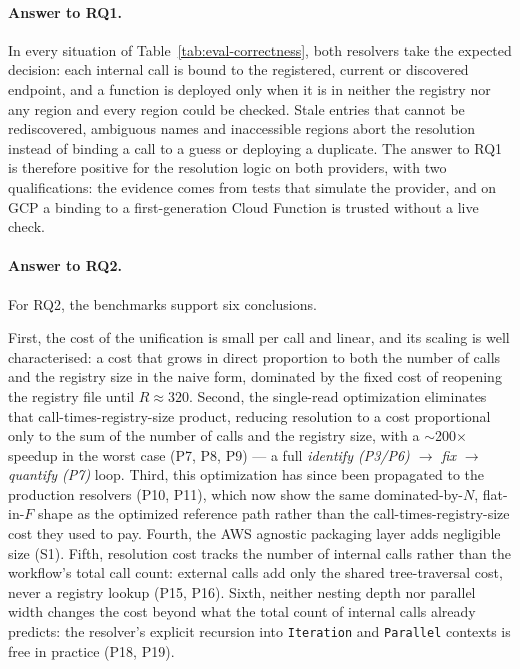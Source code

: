 \paragraph{Answer to RQ1.}
In every situation of Table~\ref{tab:eval-correctness}, both resolvers take the expected decision:
each internal call is bound to the registered, current or discovered endpoint, and a function is
deployed only when it is in neither the registry nor any region and every region could be checked.
Stale entries that cannot be rediscovered, ambiguous names and inaccessible regions abort the
resolution instead of binding a call to a guess or deploying a duplicate. The answer to RQ1 is
therefore positive for the resolution logic on both providers, with two qualifications: the
evidence comes from tests that simulate the provider, and on GCP a binding to a first-generation
Cloud Function is trusted without a live check.

\paragraph{Answer to RQ2.}
For RQ2, the benchmarks support six conclusions.

First, the cost of the unification is small per call and linear, and its scaling is well
characterised: a cost that grows in direct proportion to both the number of calls and the
registry size in the naive form, dominated by the fixed cost of reopening the
registry file until $R \approx 320$. Second, the single-read optimization eliminates that
call-times-registry-size product, reducing resolution to a cost proportional only to the sum of
the number of calls and the registry size, with a $\sim$200$\times$ speedup in the worst case
(P7, P8, P9) --- a full \emph{identify (P3/P6) $\rightarrow$ fix $\rightarrow$ quantify (P7)} loop.
Third, this optimization has since been propagated to the production resolvers (P10, P11), which
now show the same dominated-by-$N$, flat-in-$F$ shape as the optimized reference path rather than
the call-times-registry-size cost they used to pay.
Fourth, the AWS agnostic packaging layer adds negligible size (S1). Fifth, resolution cost tracks
the number of internal calls rather than the workflow's total call count: external calls add only
the shared tree-traversal cost, never a registry lookup (P15, P16). Sixth, neither nesting depth
nor parallel width changes the cost beyond what the total count of internal calls already
predicts: the resolver's explicit recursion into \texttt{Iteration} and \texttt{Parallel} contexts
is free in practice (P18, P19).

